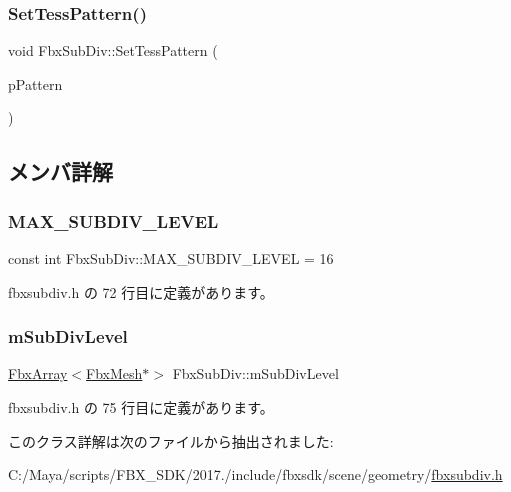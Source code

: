 \mbox{\label{class_fbx_sub_div_ab9489633777763369cc14a617d567488}} 
\subsubsection{\texorpdfstring{Set\+Tess\+Pattern()}{SetTessPattern()}}
{\footnotesize\ttfamily void Fbx\+Sub\+Div\+::\+Set\+Tess\+Pattern (\begin{DoxyParamCaption}\item[{\hyperlink{class_fbx_sub_div_a06cb3da0d9b384dc83585caa49f46684}{Fbx\+Sub\+Div\+::\+E\+Tesselation\+Pattern}}]{p\+Pattern }\end{DoxyParamCaption})}



\subsection{メンバ詳解}
\mbox{\label{class_fbx_sub_div_aa98ca1fbe21bbb387a56fe893d902a1e}} 
\subsubsection{\texorpdfstring{M\+A\+X\+\_\+\+S\+U\+B\+D\+I\+V\+\_\+\+L\+E\+V\+EL}{MAX\_SUBDIV\_LEVEL}}
{\footnotesize\ttfamily const int Fbx\+Sub\+Div\+::\+M\+A\+X\+\_\+\+S\+U\+B\+D\+I\+V\+\_\+\+L\+E\+V\+EL = 16\hspace{0.3cm}{\ttfamily [static]}}



 fbxsubdiv.\+h の 72 行目に定義があります。

\mbox{\label{class_fbx_sub_div_a4f4f0ffea9a17d4dc31ad9dcac3e89eb}} 
\subsubsection{\texorpdfstring{m\+Sub\+Div\+Level}{mSubDivLevel}}
{\footnotesize\ttfamily \hyperlink{class_fbx_array}{Fbx\+Array}$<$\hyperlink{class_fbx_mesh}{Fbx\+Mesh}$\ast$$>$ Fbx\+Sub\+Div\+::m\+Sub\+Div\+Level}



 fbxsubdiv.\+h の 75 行目に定義があります。



このクラス詳解は次のファイルから抽出されました\+:\begin{DoxyCompactItemize}
\item 
C\+:/\+Maya/scripts/\+F\+B\+X\+\_\+\+S\+D\+K/2017./include/fbxsdk/scene/geometry/\hyperlink{fbxsubdiv_8h}{fbxsubdiv.\+h}\end{DoxyCompactItemize}

